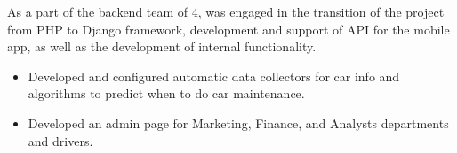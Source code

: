 As a part of the backend team of 4, was engaged in the transition of the project from PHP to Django framework, development and support of API for the mobile app, as well as the development of internal functionality.

\begin{itemize}
    \item Developed and configured automatic data collectors for car info and algorithms to predict when to do car maintenance.
    \item Developed an admin page for Marketing, Finance, and Analysts departments and drivers.
\end {itemize}
